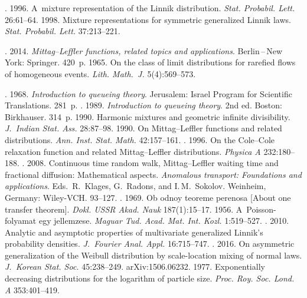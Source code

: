 \begin{multicols}{2}
{{\begin{thebibliography}{99}
. 1996. A~mixture representation of the 
Linnik distribution. \textit{Stat. Probabil. Lett.} 26:61--64. 
 1998. Mixture representations for symmetric generalized Linnik 
laws. \textit{Stat. Probabil. Lett.} 37:213--221.  

. 
2014. \textit{Mittag--Leffler functions, related topics and applications}. 
Berlin\,--\,New York: Springer. 420~p.
 1965. On the class of limit distributions for rarefied flows 
of homogeneous events. \textit{Lith. Math.~J.} 5(4):569--573. 



. 1968. 
\textit{Introduction to queueing theory}. 
Jerusalem: Israel Program for Scientific Translations. 281~p. 
. 
1989. \textit{Introduction to queueing theory}. 2nd ed. Boston: Birkhauser. 314~p.
 1990. Harmonic mixtures and geometric infinite divisibility. 
\textit{J.~Indian Stat. Ass.} 28:87--98. 
 1990. On Mittag--Leffler functions and related distributions. 
\textit{Ann. Inst. Stat. Math.} 42:157--161. 
. 1996. On the Cole--Cole relaxation function 
and related Mittag--Leffler distributions. \textit{Physica A} 232:180--188. 
. 2008. Continuous time random walk, 
Mittag--Leffler waiting time and fractional diffusion: Mathematical aspects. 
\textit{Anomalous transport: Foundations and applications}. Eds.\
R.~Klages, G.~Radons, and I.\,M.~Sokolov. Weinheim, Germany: Wiley-VCH. 93--127. 
\bibitem{39-kz}
. 1969. Ob odnoy teoreme perenosa 
[About one transfer theorem]. \textit{Dokl. USSR Akad. Nauk} 187(1):15--17. 
\bibitem{40-kz}
 1956. A~Poisson-folyamat egy jellemzese. 
\textit{Maguar Tud. Acad. Mat. Int. Kozl.} 1:519--527. 
. 2010. Analytic and asymptotic properties 
of multivariate generalized Linnik's probability densities. 
\textit{J.~Fourier Anal. Appl.} 16:715--747. 
. 2016.
 On asymmetric generalization of the Weibull distribution by scale-location mixing 
 of normal laws. \textit{J.~Korean Stat. Soc.} 45:238--249. arXiv:1506.06232. 
\bibitem{43-kz}
 1977. Exponentially decreasing distributions for the 
logarithm of particle size. \textit{Proc. Roy. Soc. Lond. A} 353:401--419. 


\end{thebibliography}}}
\end{multicols}

